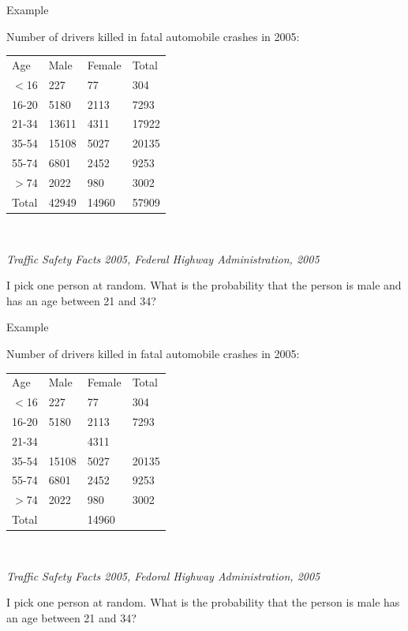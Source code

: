 \begin{frame}{Example}

  Number of drivers killed in fatal automobile crashes in 2005: \\
  \begin{tabular}{llll}
    Age & Male & Female & Total \\
    $<$16 & 227 & 77 & 304 \\
    16-20 & 5180 & 2113 & 7293 \\
    21-34 & 13611 & 4311 & 17922 \\
    35-54 & 15108 & 5027 & 20135 \\
    55-74 & 6801 & 2452 & 9253 \\
    $>$74   & 2022 & 980 & 3002 \\
    Total & 42949 & 14960 & 57909 
  \end{tabular} \\

  \vfill

  \textit{Traffic Safety Facts 2005, Federal Highway Administration,
    2005}

  \vfill

  I pick one person at random. What is the probability that the person
  is male and has an age between 21 and 34?

  
  
\end{frame}


\begin{frame}{Example}

  Number of drivers killed in fatal automobile crashes in 2005: \\
  \begin{tabular}{llll}
    Age & Male & Female & Total \\
    $<$16 & 227 & 77 & 304 \\
    16-20 & 5180 & 2113 & 7293 \\
    21-34 & \color{red}{13611} & 4311 & \color{green}{17922} \\
    35-54 & 15108 & 5027 & 20135 \\
    55-74 & 6801 & 2452 & 9253 \\
    $>$74   & 2022 & 980 & 3002 \\
    Total & \color{green}{42949} & 14960 & \color{red}{57909}
  \end{tabular} \\

  \vfill

  \textit{Traffic Safety Facts 2005, Fedoral Highway Administration,
    2005}

  \vfill

  I pick one person at random. What is the probability that the person
  is male {} has an age between 21 and 34?

  
  
\end{frame}


